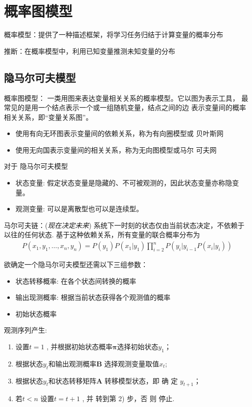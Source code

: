 \newpage
\section{概率图模型}
概率模型：提供了一种描述框架，将学习任务归结于计算变量的概率分布

推断：在概率模型中，利用已知变量推测未知变量的分布


\subsection{隐马尔可夫模型}
概率图模型：
一类用图来表达变量相关关系的概率模型。它以图为表示工具，
最常见的是用一个结点表示一个或一组随机变量，结点之间的边
表示变量间的概率相关关系，即“变量关系图”。
\begin{itemize}
    \item 使用有向无环图表示变量间的依赖关系，称为有向圈模型或
    贝叶斯网
    \item 使用无向国表示变量间的相关关系，称为无向图模型或马尔
    可夫网
\end{itemize}

对于 隐马尔可夫模型
\begin{itemize}
    \item 状态变量: 假定状态变量是隐藏的、不可被观测的，因此状态变量亦称隐变量。
    \item 观测变量: 可以是离散型也可以是连续型。
\end{itemize}
马尔可夫链：(\textit{现在决定未来})
系统下一时刻的状态仅由当前状态决定，不依赖于以往的任何状态. 基于这种依赖关系，所有变量的联合概率分布为
\begin{align*}
    P(x_1, y_1,\dots,x_n,y_n)=P(y_1)P(x_1|y_1)\prod_{i=2}^nP(y_i|y_{i-1}P(x_i|y_i))
\end{align*}


欲确定一个隐马尔可夫模型还需以下三组参数：
\begin{itemize}
    \item 状态转移概率: 在各个状态间转换的概率
    \item 输出现测概率: 根据当前状态获得各个观测值的概率
    \item 初始状态概率
\end{itemize}

观测序列产生:
\begin{enumerate}\small
    \item 设置$t=1$ , 并根据初始状态概率$\bm\pi$选择初始状态$y_1$；
    \item 根据状态$y_t$和输出观测概率$\bm B$ 选择观测变量取值$x_t$;
    \item 根据状态$y_t$和状态转移矩阵$\bm A$ 转移模型状态，即 确 定 $y_{t+1}$；
    \item 若$t<n$ 设置$t=t+1$ , 并 转到第 2) 步，否 则 停止. 
\end{enumerate}

